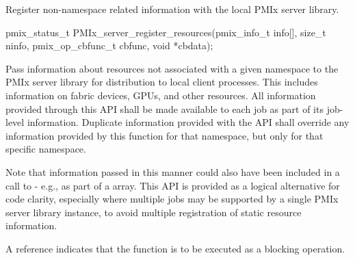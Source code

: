 \summary

Register non-namespace related information with the local \ac{PMIx} server library.

\format

\cspecificstart
\begin{codepar}
pmix_status_t
PMIx_server_register_resources(pmix_info_t info[], size_t ninfo,
                               pmix_op_cbfunc_t cbfunc,
                               void *cbdata);
\end{codepar}
\cspecificend

\begin{arglist}
\end{arglist}

\descr

Pass information about resources not associated with a given namespace to the \ac{PMIx} server library for distribution to local client processes. This includes information on fabric devices, \acp{GPU}, and other resources. All information provided through this \ac{API} shall be made available to each job as part of its job-level information. Duplicate information provided with the  \ac{API} shall override any information provided by this function for that namespace, but only for that specific namespace.

\advicermstart
Note that information passed in this manner could also have been included in a call to  - e.g., as part of a  array. This \ac{API} is provided as a logical alternative for code clarity, especially where multiple jobs may be supported by a single \ac{PMIx} server library instance, to avoid multiple registration of static resource information.

A   reference indicates that the function is to be executed as a blocking operation.
\advicermend


\subsection{}

